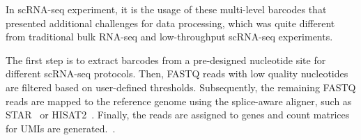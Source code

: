 \documentclass[conference]{IEEEtran}
\begin{document}

\iffalse

In scRNA-seq experiment, it is the usage of these multi-level barcodes that presented additional challenges for data processing, which was quite different from traditional bulk RNA-seq and low-throughput scRNA-seq experiments. 

The first step is to extract barcodes from a pre-designed nucleotide site for different scRNA-seq protocols. Then, FASTQ reads with low quality nucleotides are filtered based on user-defined thresholds. 
Subsequently, the remaining FASTQ reads are mapped to the reference genome using the splice-aware aligner, such as STAR~\cite{Dobin2013STAR} or HISAT2~\cite{Kim2015HISAT}. 
Finally, the reads are assigned to genes and count matrices for UMIs are generated.~\cite{Parekh2018zUMIs}. 

\end{document}

